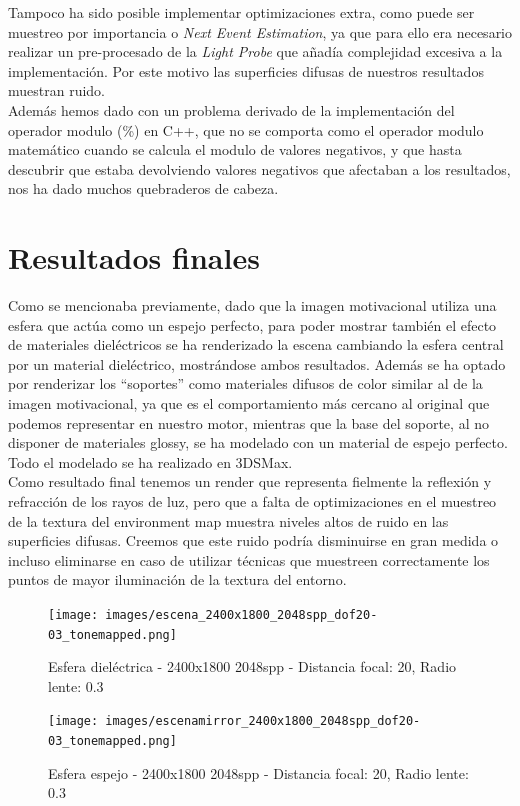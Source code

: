 \documentclass[10pt,oneside,a4paper]{article}
\begin{document}
Tampoco ha sido posible implementar optimizaciones extra, como puede ser muestreo por importancia o \emph{Next Event Estimation}, ya que para ello era necesario realizar un pre-procesado de la \emph{Light Probe} que añadía complejidad excesiva a la implementación. Por este motivo las superficies difusas de nuestros resultados muestran ruido.\\

Además hemos dado con un problema derivado de la implementación del operador modulo (\%) en C++, que no se comporta como el operador modulo matemático cuando se calcula el modulo de valores negativos, y que hasta descubrir que estaba devolviendo valores negativos que afectaban a los resultados, nos ha dado muchos quebraderos de cabeza.

\newpage
\section{Resultados finales}
Como se mencionaba previamente, dado que la imagen motivacional utiliza una esfera que actúa como un espejo perfecto, para poder mostrar también el efecto de materiales dieléctricos se ha renderizado la escena cambiando la esfera central por un material dieléctrico, mostrándose ambos resultados. Además se ha optado por renderizar los ``soportes'' como materiales difusos de color similar al de la imagen motivacional, ya que es el comportamiento más cercano al original que podemos representar en nuestro motor, mientras que la base del soporte, al no disponer de materiales glossy, se ha modelado con un material de espejo perfecto. Todo el modelado se ha realizado en 3DSMax.\\

Como resultado final tenemos un render que representa fielmente la reflexión y refracción de los rayos de luz, pero que a falta de optimizaciones en el muestreo de la textura del environment map muestra niveles altos de ruido en las superficies difusas. Creemos que este ruido podría disminuirse en gran medida o incluso eliminarse en caso de utilizar técnicas que muestreen correctamente los puntos de mayor iluminación de la textura del entorno.

\begin{figure}[h]
\centering
\texttt{[image: images/escena\_2400x1800\_2048spp\_dof20-03\_tonemapped.png]}
\caption{Esfera dieléctrica - 2400x1800 2048spp - Distancia focal: 20, Radio lente: 0.3}
\label{fig:disp}
\end{figure}

\begin{figure}[h]
\centering
\texttt{[image: images/escenamirror\_2400x1800\_2048spp\_dof20-03\_tonemapped.png]}
\caption{Esfera espejo - 2400x1800 2048spp - Distancia focal: 20, Radio lente: 0.3}
\label{fig:disp}
\end{figure}
\end{document}
